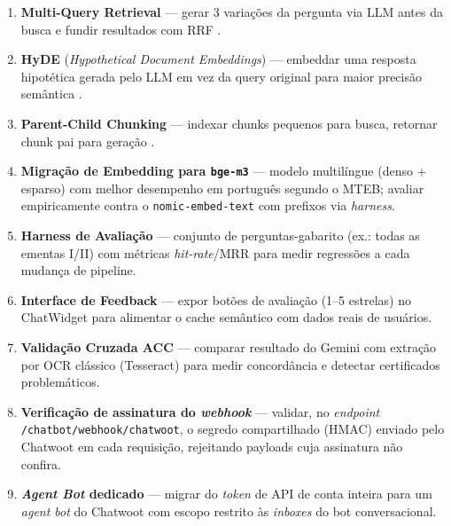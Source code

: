 \documentclass[12pt,a4paper]{report}
\begin{document}
\begin{enumerate}
  \item \textbf{Multi-Query Retrieval} — gerar 3 variações da pergunta via
        LLM antes da busca e fundir resultados com RRF
        \autocite{es2023ragas,langchain2023multiquery}.
  \item \textbf{HyDE} (\textit{Hypothetical Document Embeddings}) — embeddar
        uma resposta hipotética gerada pelo LLM em vez da query original
        para maior precisão semântica \autocite{gao2022hyde}.
  \item \textbf{Parent-Child Chunking} — indexar chunks pequenos para
        busca, retornar chunk pai para geração \autocite{llamaindex2023}.
  \item \textbf{Migração de Embedding para \texttt{bge-m3}} — modelo
        multilíngue (denso + esparso) com melhor desempenho em português
        segundo o MTEB; avaliar empiricamente contra o
        \texttt{nomic-embed-text} com prefixos via \textit{harness}.
  \item \textbf{Harness de Avaliação} — conjunto de perguntas-gabarito
        (ex.: todas as ementas I/II) com métricas \textit{hit-rate}/MRR para
        medir regressões a cada mudança de pipeline.
  \item \textbf{Interface de Feedback} — expor botões de avaliação
        (1--5 estrelas) no ChatWidget para alimentar o cache semântico
        com dados reais de usuários.
  \item \textbf{Validação Cruzada ACC} — comparar resultado do Gemini
        com extração por OCR clássico (Tesseract) para medir
        concordância e detectar certificados problemáticos.
  \item\label{item:webhook-sig} \textbf{Verificação de assinatura do
        \textit{webhook}} — validar, no \textit{endpoint}
        \texttt{/chatbot/webhook/chatwoot}, o segredo compartilhado (HMAC)
        enviado pelo Chatwoot em cada requisição, rejeitando payloads cuja
        assinatura não confira.
  \item \textbf{\textit{Agent Bot} dedicado} — migrar do \textit{token} de
        API de conta inteira para um \textit{agent bot} do Chatwoot com
        escopo restrito às \textit{inboxes} do bot conversacional.
\end{enumerate}

\printbibliography[title={Referências}]
\end{document}
